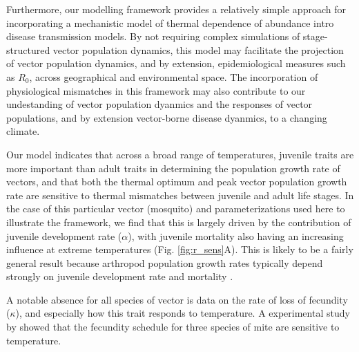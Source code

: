 Furthermore, our modelling framework provides a relatively simple approach for incorporating a mechanistic model of thermal dependence of abundance intro disease transmission models. By not requiring complex simulations of stage-structured vector population dynamics, this model may facilitate the projection of vector population dynamics, and by extension, epidemiological measures such as $R_0$, across geographical and environmental space. The incorporation of physiological mismatches in this framework may also contribute to our undestanding of vector population dyanmics and the responses of vector populations, and by extension vector-borne disease dyanmics, to a changing climate.

Our model indicates that across a broad range of temperatures, juvenile traits are more important than adult traits in determining the population growth rate of vectors, and that both the thermal optimum and peak vector population growth rate are sensitive to thermal mismatches between juvenile and adult life stages. In the case of this particular vector (mosquito) and parameterizations used here to illustrate the framework, we find that  this is largely driven by the contribution of juvenile development rate ($\alpha$), with juvenile mortality also having an increasing influence at extreme temperatures (Fig. \ref{fig:r_sens}A). This is likely to be a fairly general result because arthropod population growth rates typically depend strongly on juvenile development rate and mortality \hlfix{[Refs]}.


A notable absence for all species of vector is data on the rate of loss of fecundity ($\kappa$), and especially how this trait responds to temperature. A experimental study by \citet{Stavrinides2011} showed that the fecundity schedule for three species of mite are sensitive to temperature.


